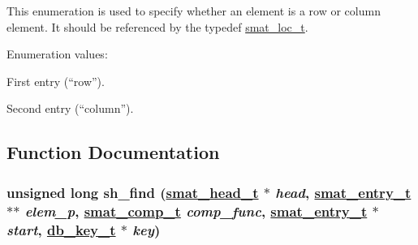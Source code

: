 This enumeration is used to specify whether an element is a row or column element. It should be referenced by the typedef \hyperlink{group__dbprim__smat_a6}{smat\_\-loc\_\-t}. \begin{Desc}
\item[Enumeration values: ]\par
\begin{description}
\item[{\em 
\hypertarget{group__dbprim__smat_a47a135}{
{\em SMAT\_\-LOC\_\-FIRST}}
\label{group__dbprim__smat_a47a135}
}]First entry (``row''). \item[{\em 
\hypertarget{group__dbprim__smat_a47a136}{
{\em SMAT\_\-LOC\_\-SECOND}}
\label{group__dbprim__smat_a47a136}
}]Second entry (``column''). \end{description}
\end{Desc}



\subsection{Function Documentation}
\hypertarget{group__dbprim__smat_a19}{
\subsubsection[sh\_\-find]{\setlength{\rightskip}{0pt plus 5cm}unsigned long sh\_\-find (\hyperlink{group__dbprim__smat_a1}{smat\_\-head\_\-t} $\ast$ {\em head}, \hyperlink{group__dbprim__smat_a2}{smat\_\-entry\_\-t} $\ast$$\ast$ {\em elem\_\-p}, \hyperlink{group__dbprim__smat_a5}{smat\_\-comp\_\-t} {\em comp\_\-func}, \hyperlink{group__dbprim__smat_a2}{smat\_\-entry\_\-t} $\ast$ {\em start}, \hyperlink{group__dbprim_a0}{db\_\-key\_\-t} $\ast$ {\em key})}}
\label{group__dbprim__smat_a19}


